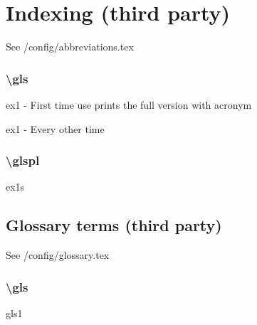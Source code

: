 \section{Indexing (third party)}
See /config/abbreviations.tex
\subsubsection{\textbackslash gls }
\gls{ex1} - First time use prints the full version with acronym

\gls{ex1} - Every other time


\subsubsection{\textbackslash glspl}
\glspl{ex1}


\subsection{Glossary terms (third party)}
See /config/glossary.tex
\subsubsection{\textbackslash gls}
\gls{gls1}
\\
\\
